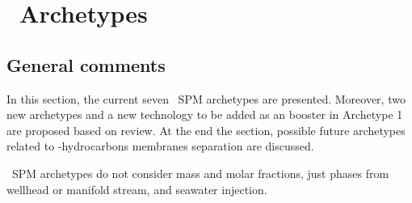 \section{\Floco~Archetypes}
\subsection{General comments}
In this section, the current seven \Floco~SPM archetypes are presented. Moreover, two new archetypes and a new technology to be added as an booster in Archetype 1 are proposed based on  review. At the end the section, possible future archetypes related to \CO-hydrocarbons membranes separation are discussed.

\Floco~SPM archetypes do not consider mass and molar fractions, just phases from wellhead or manifold stream, and seawater injection.

